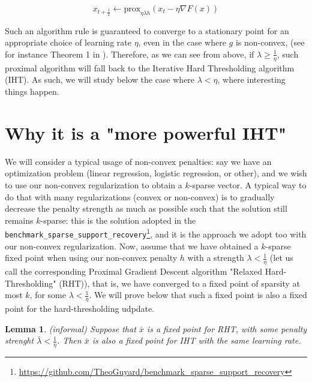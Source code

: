 \documentclass{article}
\newtheorem{lemma}{Lemma}
\begin{document}
$$x_{t+\frac{1}{2}} \leftarrow \text{prox}_{\eta \lambda h}(x_t - \eta \nabla F (x))$$

Such an algorithm rule is guaranteed to converge to a stationary point for an appropriate choice of learning rate $\eta$, even in the case where $g$ is non-convex, (see for instance Theorem 1 in \cite{xu2019non}). Therefore, as we can see from above, if $\lambda \geq \frac{1}{\eta}$, such proximal algorithm will fall back to the Iterative Hard Thresholding algorithm (IHT). As such, we will study below the case where $\lambda < \eta$, where interesting things happen.

\section{Why it is a "more powerful IHT"}






We will consider a typical usage of non-convex penalties: say we have an optimization problem (linear regression, logistic regression, or other), and we wish to use our non-convex regularization to obtain a $k$-sparse vector. A typical way to do that with many regularizations (convex or non-convex) is to gradually decrease the penalty strength as much as possible such that the solution still remains $k$-sparse: this is the solution adopted in the \texttt{benchmark\_sparse\_support\_recovery}\footnote{\url{https://github.com/TheoGuyard/benchmark_sparse_support_recovery}}, and it is the approach we adopt too with our non-convex regularization.  Now, assume that we have obtained a $k$-sparse fixed point when using our non-convex penalty $h$ with a strength $\lambda < \frac{1}{\eta}$ (let us call the corresponding Proximal Gradient Descent algorithm "Relaxed Hard-Thresholding" (RHT)), that is, we have converged to a fixed point of sparsity at most $k$, for some $\lambda < \frac{1}{\eta}$. We will prove below that such a fixed point is also a fixed point for the hard-thresholding udpdate. 


\begin{lemma}(informal)
Suppose that $\bar{x}$ is a fixed point for RHT, with some penalty strenght $\bar{\lambda} < \frac{1}{\eta}$. Then $\bar{x}$ is also a fixed point for IHT with the same learning rate.
\end{lemma}
\end{document}
